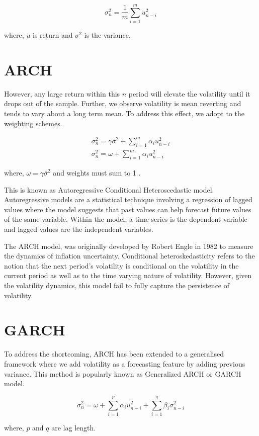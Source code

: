 \documentclass[10pt]{article}
\begin{document}
$$
\sigma_{n}^{2}=\frac{1}{m} \sum_{i=1}^{m} u_{n-i}^{2}
$$

where, $u$ is return and $\sigma^{2}$ is the variance.

\section*{ARCH}
However, any large return within this $n$ period will elevate the volatility until it drops out of the sample. Further, we observe volatility is mean reverting and tends to vary about a long term mean. To address this effect, we adopt to the weighting schemes.

$$
\begin{gathered}
\sigma_{n}^{2}=\gamma \bar{\sigma}^{2}+\sum_{i=1}^{m} \alpha_{i} u_{n-i}^{2} \\
\sigma_{n}^{2}=\omega+\sum_{i=1}^{m} \alpha_{i} u_{n-i}^{2}
\end{gathered}
$$

where, $\omega=\gamma \bar{\sigma}^{2}$ and weights must sum to 1 .

This is known as Autoregressive Conditional Heteroscedastic model. Autoregressive models are a statistical technique involving a regression of lagged values where the model suggests that past values can help forecast future values of the same variable. Within the model, a time series is the dependent variable and lagged values are the independent variables.

The ARCH model, was originally developed by Robert Engle in 1982 to measure the dynamics of inflation uncertainty. Conditional heteroskedasticity refers to the notion that the next period's volatility is conditional on the volatility in the current period as well as to the time varying nature of volatility. However, given the volatility dynamics, this model fail to fully capture the persistence of volatility.

\section*{GARCH}
To address the shortcoming, ARCH has been extended to a generalised framework where we add volatility as a forecasting feature by adding previous variance. This method is popularly known as Generalized ARCH or GARCH model.

$$
\sigma_{n}^{2}=\omega+\sum_{i=1}^{p} \alpha_{i} u_{n-i}^{2}+\sum_{i=1}^{q} \beta_{i} \sigma_{n-i}^{2}
$$

where, $p$ and $q$ are lag length.
\end{document}
